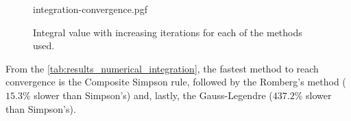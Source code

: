 \begin{figure}[tb!]
    \centering
    {integration-convergence.pgf}
    \caption{Integral value with increasing iterations for each of the methods used.}
    \label{fig:integration_convergence}
\end{figure}

From the \cref{tab:results_numerical_integration}, the fastest method to reach
convergence is the Composite Simpson rule, followed by the Romberg's method
($15.3\%$ slower than Simpson's) and,
lastly, the Gauss-Legendre ($437.2\%$ slower than Simpson's).
